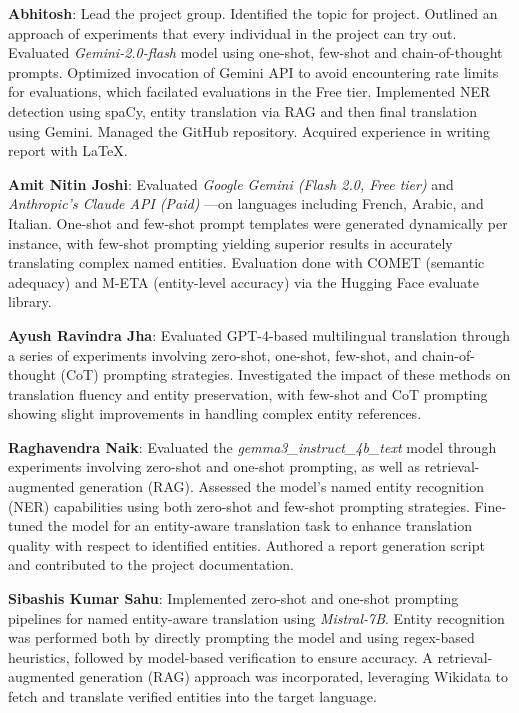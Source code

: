 \documentclass{ecai}
\begin{document}
\textbf{Abhitosh}: Lead the project group. Identified the topic for project. Outlined an approach of experiments that every individual in the project can try out.
Evaluated \textit{Gemini-2.0-flash} model using one-shot, few-shot and chain-of-thought prompts. Optimized invocation of Gemini API to avoid encountering 
rate limits for evaluations, which facilated evaluations in the Free tier. 
Implemented NER detection using spaCy, entity translation via RAG and 
then final translation using Gemini. Managed the GitHub repository. Acquired experience in writing report with LaTeX.

\textbf{Amit Nitin Joshi}: Evaluated \textit{Google Gemini (Flash 2.0, Free tier)} and \textit{Anthropic’s Claude API (Paid)} —on languages
including French, Arabic, and Italian. One-shot and few-shot prompt templates were generated dynamically per instance,
with few-shot prompting yielding superior results in accurately translating complex named entities. 
Evaluation done with COMET (semantic adequacy) and M-ETA (entity-level accuracy) via the Hugging Face evaluate library.

\textbf{Ayush Ravindra Jha}: Evaluated GPT-4-based multilingual translation through a series of experiments involving zero-shot,
one-shot, few-shot, and chain-of-thought (CoT) prompting strategies. Investigated the impact of these methods on translation fluency 
and entity preservation, with few-shot and CoT prompting showing slight improvements in handling complex entity references.

\textbf{Raghavendra Naik}: Evaluated the \textit{gemma3\_instruct\_4b\_text} model through experiments 
involving zero-shot and one-shot prompting, as well as retrieval-augmented generation (RAG). 
Assessed the model's named entity recognition (NER) capabilities using both zero-shot and few-shot prompting
strategies. Fine-tuned the model for an entity-aware translation task to enhance translation quality with 
respect to identified entities. Authored a report generation script and contributed to the project 
documentation.

\textbf{Sibashis Kumar Sahu}: Implemented zero-shot and one-shot prompting pipelines for 
named entity-aware translation using \textit{Mistral-7B}. Entity recognition was performed both by directly 
prompting the model and using regex-based heuristics, followed by model-based verification to ensure accuracy.
A retrieval-augmented generation (RAG) approach was incorporated, leveraging Wikidata to fetch and translate 
verified entities into the target language.
\end{document}
